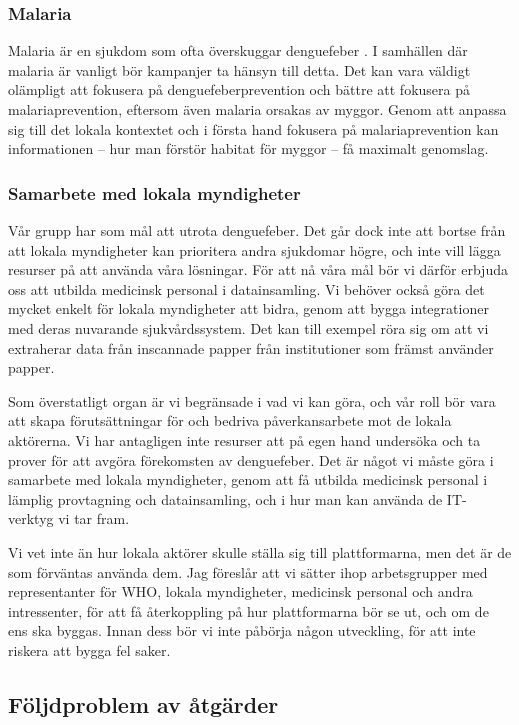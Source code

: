 \documentclass{article}
\begin{document}
\subsubsection{Malaria}
Malaria är en sjukdom som ofta överskuggar denguefeber . I samhällen där malaria är vanligt bör kampanjer ta hänsyn till detta. Det kan vara väldigt olämpligt att fokusera på denguefeberprevention och bättre att fokusera på malariaprevention, eftersom även malaria orsakas av myggor. Genom att anpassa sig till det lokala kontextet och i första hand fokusera på malariaprevention kan informationen – hur man förstör habitat för myggor – få maximalt genomslag.

\subsubsection{Samarbete med lokala myndigheter}
Vår grupp har som mål att utrota denguefeber. Det går dock inte att bortse från att lokala myndigheter kan prioritera andra sjukdomar högre, och inte vill lägga resurser på att använda våra lösningar. För att nå våra mål bör vi därför erbjuda oss att utbilda medicinsk personal i datainsamling. Vi behöver också göra det mycket enkelt för lokala myndigheter att bidra, genom att bygga integrationer med deras nuvarande sjukvårdssystem. Det kan till exempel röra sig om att vi extraherar data från inscannade papper från institutioner som främst använder papper.

Som överstatligt organ är vi begränsade i vad vi kan göra, och vår roll bör vara att skapa förutsättningar för och bedriva påverkansarbete mot de lokala aktörerna. Vi har antagligen inte resurser att på egen hand undersöka och ta prover för att avgöra förekomsten av denguefeber. Det är något vi måste göra i samarbete med lokala myndigheter, genom att få utbilda medicinsk personal i lämplig provtagning och datainsamling, och i hur man kan använda de IT-verktyg vi tar fram.

Vi vet inte än hur lokala aktörer skulle ställa sig till plattformarna, men det är de som förväntas använda dem. Jag föreslår att vi sätter ihop arbetsgrupper med representanter för WHO, lokala myndigheter, medicinsk personal och andra intressenter, för att få återkoppling på hur plattformarna bör se ut, och om de ens ska byggas. Innan dess bör vi inte påbörja någon utveckling, för att inte riskera att bygga fel saker.

\subsection{Följdproblem av åtgärder}
\end{document}

